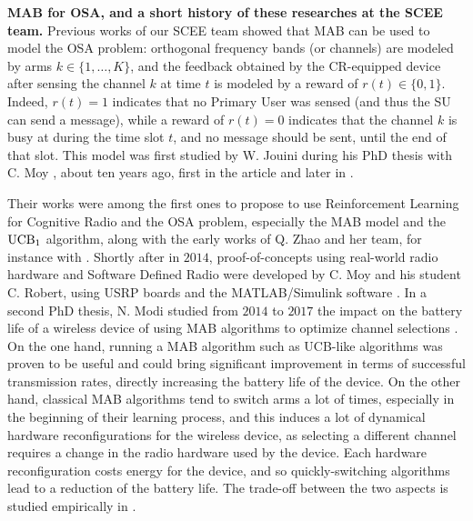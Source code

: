 \textbf{MAB for OSA, and a short history of these researches at the SCEE team.}
%
Previous works of our SCEE team showed that MAB can be used to model the OSA problem:
orthogonal frequency bands (or channels) are modeled by arms $k\in\{1,\dots,K\}$,
and the feedback obtained by the CR-equipped device after sensing the channel $k$ at time $t$ is modeled by a reward of $r(t) \in \{0,1\}$.
Indeed, $r(t) = 1$ indicates that no Primary User was sensed (and thus the SU can send a message), while a reward of $r(t)=0$ indicates that the channel $k$ is busy at during the time slot $t$, and no message should be sent, until the end of that slot.
%
This model was first studied by W. Jouini during his PhD thesis with C. Moy \cite{Jouini12PhD}, about ten years ago, first in the article \cite{Jouini09} and later in \cite{Jouini10,Jouini12}.

Their works were among the first ones to propose to use Reinforcement Learning for Cognitive Radio and the OSA problem, especially the MAB model and the $\mathrm{UCB}_1$ algorithm,
along with the early works of Q. Zhao and her team, for instance with \cite{Liu08,Zhao10}.
%
Shortly after in $2014$, proof-of-concepts using real-world radio hardware and Software Defined Radio were developed by C. Moy and his student C. Robert, using USRP boards and the MATLAB/Simulink software \cite{RobertSDR2014,MoyWSR2014}.
In a second PhD thesis, N. Modi studied from $2014$ to $2017$ the impact on the battery life of a wireless device of using MAB algorithms to optimize channel selections \cite{Modi17PhD}.
On the one hand, running a MAB algorithm such as UCB-like algorithms was proven to be useful and could bring significant improvement in terms of successful transmission rates, directly increasing the battery life of the device.
On the other hand, classical MAB algorithms tend to switch arms a lot of times, especially in the beginning of their learning process, and this induces a lot of dynamical hardware reconfigurations for the wireless device, as selecting a different channel requires a change in the radio hardware used by the device.
Each hardware reconfiguration costs energy for the device, and so quickly-switching algorithms lead to a reduction of the battery life.
The trade-off between the two aspects is studied empirically in
\cite{modiDemo2016}.


